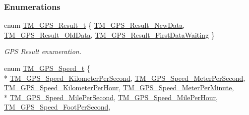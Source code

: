 \subsubsection*{Enumerations}
\begin{DoxyCompactItemize}
\item 
enum \hyperlink{group___t_m___g_p_s___typedefs_gaf3a9184315a145cb8288691c9c529427}{T\+M\+\_\+\+G\+P\+S\+\_\+\+Result\+\_\+t} \{ \hyperlink{group___t_m___g_p_s___typedefs_ggaf3a9184315a145cb8288691c9c529427a53532f11f7d268cfe75af5360985ff34}{T\+M\+\_\+\+G\+P\+S\+\_\+\+Result\+\_\+\+New\+Data}, 
\hyperlink{group___t_m___g_p_s___typedefs_ggaf3a9184315a145cb8288691c9c529427a5098e6636e25483bc0580f8d947a0ff8}{T\+M\+\_\+\+G\+P\+S\+\_\+\+Result\+\_\+\+Old\+Data}, 
\hyperlink{group___t_m___g_p_s___typedefs_ggaf3a9184315a145cb8288691c9c529427aa2f7b7cdbec59f8c65f5658f79b4c699}{T\+M\+\_\+\+G\+P\+S\+\_\+\+Result\+\_\+\+First\+Data\+Waiting}
 \}
\begin{DoxyCompactList}\small\item\em G\+P\+S Result enumeration. \end{DoxyCompactList}\item 
enum \hyperlink{group___t_m___g_p_s___typedefs_ga287710c2af22ad207c305aeb2e6ea69c}{T\+M\+\_\+\+G\+P\+S\+\_\+\+Speed\+\_\+t} \{ \\*
\hyperlink{group___t_m___g_p_s___typedefs_gga287710c2af22ad207c305aeb2e6ea69ca8d11b15f0cb345f4bee32f81c28bdf39}{T\+M\+\_\+\+G\+P\+S\+\_\+\+Speed\+\_\+\+Kilometer\+Per\+Second}, 
\hyperlink{group___t_m___g_p_s___typedefs_gga287710c2af22ad207c305aeb2e6ea69cae9dabca9609268b7b4f1c734468c7ba0}{T\+M\+\_\+\+G\+P\+S\+\_\+\+Speed\+\_\+\+Meter\+Per\+Second}, 
\hyperlink{group___t_m___g_p_s___typedefs_gga287710c2af22ad207c305aeb2e6ea69ca4d4545cfd544e9faa21ab9fab27a547a}{T\+M\+\_\+\+G\+P\+S\+\_\+\+Speed\+\_\+\+Kilometer\+Per\+Hour}, 
\hyperlink{group___t_m___g_p_s___typedefs_gga287710c2af22ad207c305aeb2e6ea69caab87eb44fa2a6f746e3e781c20ab0686}{T\+M\+\_\+\+G\+P\+S\+\_\+\+Speed\+\_\+\+Meter\+Per\+Minute}, 
\\*
\hyperlink{group___t_m___g_p_s___typedefs_gga287710c2af22ad207c305aeb2e6ea69ca1f008d3244a1dd9484803b395e3f7934}{T\+M\+\_\+\+G\+P\+S\+\_\+\+Speed\+\_\+\+Mile\+Per\+Second}, 
\hyperlink{group___t_m___g_p_s___typedefs_gga287710c2af22ad207c305aeb2e6ea69cac9675749404f3acdeb86c6f1e5662645}{T\+M\+\_\+\+G\+P\+S\+\_\+\+Speed\+\_\+\+Mile\+Per\+Hour}, 
\hyperlink{group___t_m___g_p_s___typedefs_gga287710c2af22ad207c305aeb2e6ea69ca7697495c587b9a02721db14acc62c59a}{T\+M\+\_\+\+G\+P\+S\+\_\+\+Speed\+\_\+\+Foot\+Per\+Second}, 

\end{DoxyCompactItemize}
